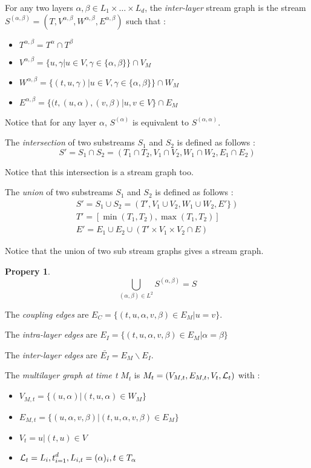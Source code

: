 \documentclass[dvipsnames,a4paper,11pt]{article}
\newtheorem{prop}{Propery}
\theoremstyle{definition}
\theoremstyle{remark}
\begin{document}
	For any two layers $\alpha, \beta \in L_1\times \dots\times L_d$, the {\em inter-layer} stream graph is the stream $S^{(\alpha,\beta)} = (T, V^{\alpha,\beta},W^{\alpha,\beta},E^{\alpha,\beta})$ such that :
	\begin{itemize}
		\item $T^{\alpha,\beta}=T^{\alpha}\cap T^{\beta}$
		\item $V^{\alpha,\beta} = \{u,\gamma | u \in V, \gamma \in \{\alpha,\beta\} \} \cap V_M$
		\item $W^{\alpha,\beta}= \{(t,u,\gamma) | u \in V, \gamma \in \{\alpha,\beta\} \} \cap W_M$
	    \item $E^{\alpha,\beta} = \{(t,(u,\alpha),(v,\beta) | u,v \in V\} \cap E_M $
	\end{itemize}
	
	    Notice that for any layer $\alpha$, $S^{(\alpha)}$ is equivalent to $S^{(\alpha,\alpha)}$.
	
	
	The {\em intersection} of two substreams $S_1$ and $S_2$ is defined as follows :
	\[
		S' = S_1 \cap S_2 = (T_1\cap T_2, V_1 \cap V_2, W_1 \cap W_2, E_1\cap E_2) 
	\]
	
	Notice that this intersection is a stream graph too.
	
	The {\em union} of two substreams $S_1$ and $S_2$ is defined as follows :
	\begin{align*}
		S' = S_1 \cup S_2 = (T', V_1 \cup V_2, W_1 \cup W_2, E' \})\\
		T' = [\min(T_1,T_2),\max(T_1,T_2)]\\
		E' = E_1 \cup E_2 \cup (T'\times V_1 \times V_2 \cap E )
	\end{align*}
		 
	Notice that the union of two sub stream graphs gives a stream graph.
	
	\begin{prop}
		\[
			\bigcup_{(\alpha,\beta) \in L^2} S^{(\alpha,\beta)} = S
		\]
	\end{prop}
	
	
    The {\em coupling edges} are $E_C=\{(t,u,\alpha,v,\beta)\in E_M | u=v\}$.
    
    The {\em intra-layer edges} are $E_I = \{(t,u,\alpha,v,\beta) \in E_M | \alpha = \beta \}$
    
    The {\em inter-layer edges} are $\bar{E_I} = E_M\backslash E_I$.
    
   	The {\em multilayer graph at time t} $M_t$ is $M_t = (V_{M,t}, E_{M,t},V_t,{\cal L}_t)$ with : 
    \begin{itemize}
		\item $V_{M,t} = \{(u,\alpha)| (t,u,\alpha)\in W_M\}$
		\item $E_{M,t} = \{(u,\alpha,v,\beta) | (t,u,\alpha,v,\beta) \in E_M\}$
		\item $V_t = {u | (t,u) \in V}$
		\item ${\cal L}_t = {L_i,t}_{i=1}^d, L_{i,t}=(\alpha)_i, t\in T_\alpha$
    \end{itemize}
    
\end{document}
